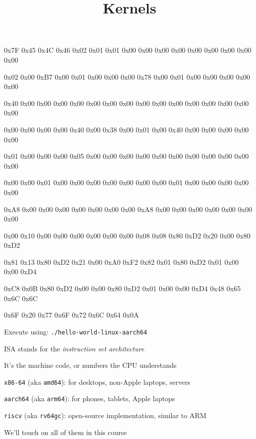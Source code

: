 

\title{Kernels}



\begin{frame}
  \titlepage
\end{frame}

\begin{slide}

  \small \ttfamily
  0x7F 0x45 0x4C 0x46 0x02 0x01 0x01 0x00 0x00 0x00 0x00 0x00 0x00 0x00 0x00
  0x00

  0x02 0x00 0xB7 0x00 0x01 0x00 0x00 0x00 0x78 0x00 0x01 0x00 0x00 0x00 0x00
  0x00

  0x40 0x00 0x00 0x00 0x00 0x00 0x00 0x00 0x00 0x00 0x00 0x00 0x00 0x00 0x00
  0x00

  0x00 0x00 0x00 0x00 0x40 0x00 0x38 0x00 0x01 0x00 0x40 0x00 0x00 0x00 0x00
  0x00

  0x01 0x00 0x00 0x00 0x05 0x00 0x00 0x00 0x00 0x00 0x00 0x00 0x00 0x00 0x00
  0x00

  0x00 0x00 0x01 0x00 0x00 0x00 0x00 0x00 0x00 0x00 0x01 0x00 0x00 0x00 0x00
  0x00

  0xA8 0x00 0x00 0x00 0x00 0x00 0x00 0x00 0xA8 0x00 0x00 0x00 0x00 0x00 0x00
  0x00

  0x00 0x10 0x00 0x00 0x00 0x00 0x00 0x00 0x08 0x08 0x80 0xD2 0x20 0x00 0x80
  0xD2

  0x81 0x13 0x80 0xD2 0x21 0x00 0xA0 0xF2 0x82 0x01 0x80 0xD2 0x01 0x00 0x00
  0xD4

  0xC8 0x0B 0x80 0xD2 0x00 0x00 0x80 0xD2 0x01 0x00 0x00 0xD4 0x48 0x65 0x6C
  0x6C

  0x6F 0x20 0x77 0x6F 0x72 0x6C 0x64 0x0A
  \bigskip

  \normalsize \normalfont Execute using:
  \texttt{./hello-world-linux-aarch64}
\end{slide}

\begin{slide}
  

  ISA stands for the \textit{instruction set architecture}

  \leftspace{} It's the machine code, or numbers the CPU understands
  \bigskip

  \texttt{x86-64} (aka \texttt{amd64}): for desktops, non-Apple laptops,
                                          servers
  \medskip

  \texttt{aarch64} (aka \texttt{arm64}): for phones, tablets, Apple laptops
  \medskip

  \texttt{riscv} (aka \texttt{rv64gc}): open-source implementation, similar to
                                        ARM
  \bigskip

  We'll touch on all of them in this course
\end{slide}


